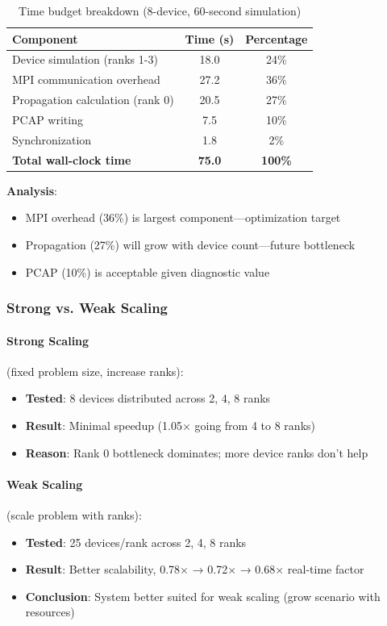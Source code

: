 \begin{table}[htbp]
\centering
\caption{Time budget breakdown (8-device, 60-second simulation)}
\label{tab:time-breakdown}
\begin{tabular}{@{}lcc@{}}
\toprule
\textbf{Component} & \textbf{Time (s)} & \textbf{Percentage} \\
\midrule
Device simulation (ranks 1-3) & 18.0 & 24\% \\
MPI communication overhead & 27.2 & 36\% \\
Propagation calculation (rank 0) & 20.5 & 27\% \\
PCAP writing & 7.5 & 10\% \\
Synchronization & 1.8 & 2\% \\
\midrule
\textbf{Total wall-clock time} & \textbf{75.0} & \textbf{100\%} \\
\bottomrule
\end{tabular}
\end{table}

\textbf{Analysis}:
\begin{itemize}
    \item MPI overhead (36\%) is largest component—optimization target
    \item Propagation (27\%) will grow with device count—future bottleneck
    \item PCAP (10\%) is acceptable given diagnostic value
\end{itemize}

\subsubsection{Strong vs. Weak Scaling}

\paragraph{Strong Scaling} (fixed problem size, increase ranks):
\begin{itemize}
    \item \textbf{Tested}: 8 devices distributed across 2, 4, 8 ranks
    \item \textbf{Result}: Minimal speedup (1.05× going from 4 to 8 ranks)
    \item \textbf{Reason}: Rank 0 bottleneck dominates; more device ranks don't help
\end{itemize}

\paragraph{Weak Scaling} (scale problem with ranks):
\begin{itemize}
    \item \textbf{Tested}: 25 devices/rank across 2, 4, 8 ranks
    \item \textbf{Result}: Better scalability, 0.78× → 0.72× → 0.68× real-time factor
    \item \textbf{Conclusion}: System better suited for weak scaling (grow scenario with resources)
\end{itemize}

